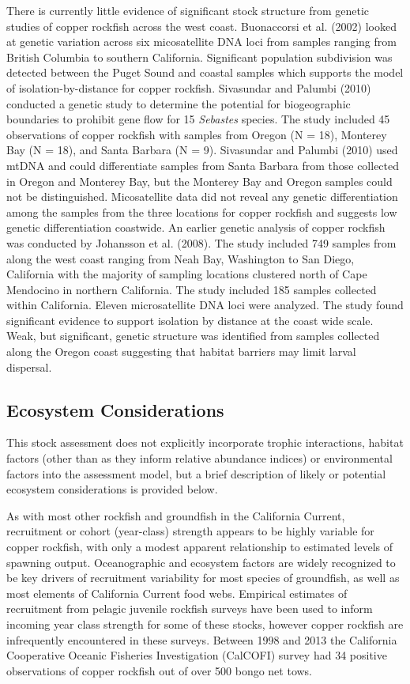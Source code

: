 \documentclass[11pt,
  english,
  letterpaper,
]{article}
\begin{document}
There is currently little evidence of significant stock structure from genetic studies of copper rockfish across the west coast. Buonaccorsi et al. (2002) looked at genetic variation across six micosatellite DNA loci from samples ranging from British Columbia to southern California. Significant population subdivision was detected between the Puget Sound and coastal samples which supports the model of isolation-by-distance for copper rockfish. Sivasundar and Palumbi (2010) conducted a genetic study to determine the potential for biogeographic boundaries to prohibit gene flow for 15 \emph{Sebastes} species. The study included 45 observations of copper rockfish with samples from Oregon (N = 18), Monterey Bay (N = 18), and Santa Barbara (N = 9). Sivasundar and Palumbi (2010) used mtDNA and could differentiate samples from Santa Barbara from those collected in Oregon and Monterey Bay, but the Monterey Bay and Oregon samples could not be distinguished. Micosatellite data did not reveal any genetic differentiation among the samples from the three locations for copper rockfish and suggests low genetic differentiation coastwide. An earlier genetic analysis of copper rockfish was conducted by Johansson et al. (2008). The study included 749 samples from along the west coast ranging from Neah Bay, Washington to San Diego, California with the majority of sampling locations clustered north of Cape Mendocino in northern California. The study included 185 samples collected within California. Eleven microsatellite DNA loci were analyzed. The study found significant evidence to support isolation by distance at the coast wide scale. Weak, but significant, genetic structure was identified from samples collected along the Oregon coast suggesting that habitat barriers may limit larval dispersal.

\hypertarget{ecosystem-considerations-1}{%
\subsection{Ecosystem Considerations}\label{ecosystem-considerations-1}}

This stock assessment does not explicitly incorporate trophic interactions, habitat factors (other than as they inform relative abundance indices) or environmental factors into the assessment model, but a brief description of likely or potential ecosystem considerations is provided below.

As with most other rockfish and groundfish in the California Current, recruitment or cohort (year-class) strength appears to be highly variable for copper rockfish, with only a modest apparent relationship to estimated levels of spawning output. Oceanographic and ecosystem factors are widely recognized to be key drivers of recruitment variability for most species of groundfish, as well as most elements of California Current food webs. Empirical estimates of recruitment from pelagic juvenile rockfish surveys have been used to inform incoming year class strength for some of these stocks, however copper rockfish are infrequently encountered in these surveys. Between 1998 and 2013 the California Cooperative Oceanic Fisheries Investigation (CalCOFI) survey had 34 positive observations of copper rockfish out of over 500 bongo net tows.
\end{document}
